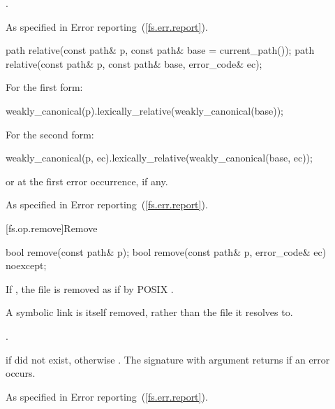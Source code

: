 \begin{itemdescr}
\pnum
\returns {}.

\pnum
\throws As specified in Error reporting~(\ref{fs.err.report}).
\end{itemdescr}

%
\begin{itemdecl}
path relative(const path& p, const path& base = current_path());
path relative(const path& p, const path& base, error_code& ec);
\end{itemdecl}

\begin{itemdescr}
\pnum
\returns For the first form:
\begin{codeblock}
weakly_canonical(p).lexically_relative(weakly_canonical(base));
\end{codeblock}
  For the second form:
\begin{codeblock}
weakly_canonical(p, ec).lexically_relative(weakly_canonical(base, ec));
\end{codeblock}
  or  at the first error occurrence, if any.

\pnum
\throws As specified in Error reporting~(\ref{fs.err.report}).
\end{itemdescr}

[fs.op.remove]{Remove}

%
\begin{itemdecl}
bool remove(const path& p);
bool remove(const path& p, error_code& ec) noexcept;
\end{itemdecl}

\begin{itemdescr}
\pnum
\effects If , the file  is
  removed as if by POSIX .
\begin{note} A symbolic link is itself removed, rather than the file it
  resolves to. \end{note}

\pnum
\postconditions {}.

\pnum
\returns {} if  did not exist,
  otherwise . The signature with argument 
  returns  if an error occurs.

\pnum
\throws As specified in Error reporting~(\ref{fs.err.report}).
\end{itemdescr}


